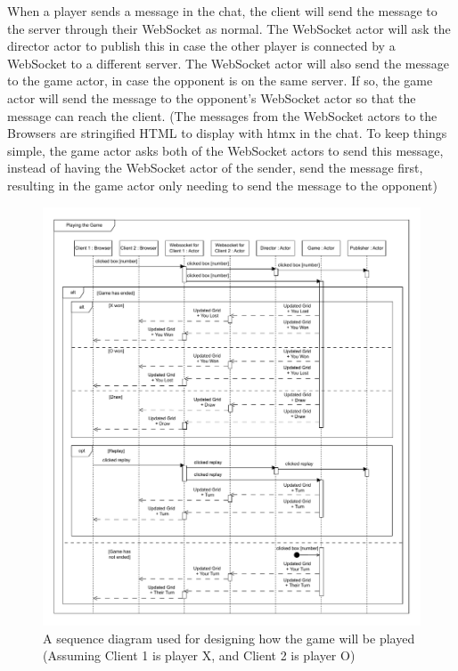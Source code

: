 \documentclass[]{interim}
\begin{document}
When a player sends a message in the chat, the client will send the message to
the server through their WebSocket as normal. The WebSocket actor will ask the
director actor to publish this in case the other player is connected by a WebSocket
to a different server. The WebSocket actor will also send the message to the game
actor, in case the opponent is on the same server. If so, the game actor will
send the message to the opponent's WebSocket actor so that the message can reach
the client. (The messages from the WebSocket actors to the Browsers are
stringified HTML to display with htmx in the chat. To keep things simple, the game
actor asks both of the WebSocket actors to send this message, instead of having
the WebSocket actor of the sender, send the message first, resulting in the game
actor only needing to send the message to the opponent)

\newpage

\begin{figure}[ht!]
  \centering
  \includegraphics[width=\linewidth]{sequence_playing}
  \caption{A sequence diagram used for designing how the game will be played (Assuming Client 1 is player X, and Client 2 is player O)}
  \label{fig: 11}
\end{figure}
\end{document}
